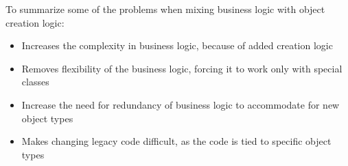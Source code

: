 To summarize some of the problems when mixing business logic with
object creation logic:
\begin{itemize}
\item Increases the complexity in business logic, because of added creation
logic
\item Removes flexibility of the business logic, forcing it to work only
with special classes
\item Increase the need for redundancy of business logic to accommodate
for new object types
\item Makes changing legacy code difficult, as the code is tied to specific
object types\end{itemize}

